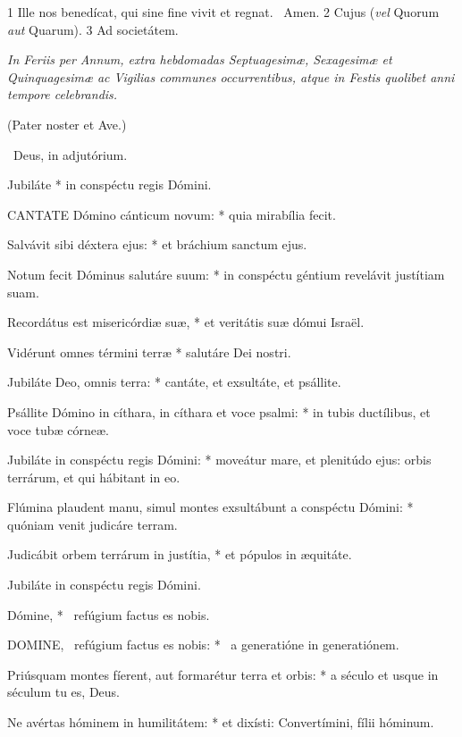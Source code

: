  1 Ille nos benedícat, qui sine fine vivit et regnat. \R\ Amen. 2 Cujus (\textit{vel} Quorum \textit{aut} Quarum). 3 Ad societátem.

\sectionornament


\textit{In Feriis per Annum, extra hebdomadas Septuagesimæ, Sexagesimæ et Quinquagesimæ ac Vigilias communes occurrentibus, atque in Festis quolibet anni tempore celebrandis.}

(Pater noster et Ave.)

\V\ Deus, in adjutórium.

 Jubiláte * in conspéctu regis Dómini.


\lettrine[lines=2]{C}{ANTATE} Dómino cánticum novum: * quia mirabília fecit.

Salvávit sibi déxtera ejus: * et bráchium sanctum ejus.

Notum fecit Dóminus salutáre suum: * in conspéctu géntium revelávit justítiam suam.

Recordátus est misericórdiæ suæ, * et veritátis suæ dómui Israël.

Vidérunt omnes términi terræ * salutáre Dei nostri.

Jubiláte Deo, omnis terra: * cantáte, et exsultáte, et psállite.

Psállite Dómino in cíthara, in cíthara et voce psalmi: * in tubis ductílibus, et voce tubæ córneæ.

Jubiláte in conspéctu regis Dómini: * moveátur mare, et plenitúdo ejus: orbis terrárum, et qui hábitant in eo.

Flúmina plaudent manu, simul montes exsultábunt a conspéctu Dómini: * quóniam venit judicáre terram.

Judicábit orbem terrárum in justítia, * et pópulos in æquitáte.

 Jubiláte in conspéctu regis Dómini.

 Dómine, * \textdagger\ refúgium factus es nobis. \textdaggerdbl


\lettrine[lines=2]{D}{OMINE}, \textdagger\ refúgium factus es nobis: * \textdaggerdbl\ a generatióne in generatiónem.

Priúsquam montes fíerent, aut formarétur terra et orbis: * a século et usque in séculum tu es, Deus.

Ne avértas hóminem in humilitátem: * et dixísti: Convertímini, fílii hóminum.

